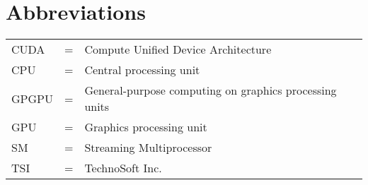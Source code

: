 
\section*{{\Huge Abbreviations}}
\vspace{1 cm}

\noindent
\begin{center}
\begin{tabular}{ l c l }
   CUDA & = & Compute Unified Device Architecture \\
   CPU & = & Central processing unit \\
   GPGPU & = & General-purpose computing on graphics processing units \\
   GPU & = & Graphics processing unit \\
   SM & = & Streaming Multiprocessor \\
   TSI & = & TechnoSoft Inc. \\
\end{tabular}
\end{center}

\cleardoublepage

\pagestyle{fancy}
\fancyhf{}
\renewcommand{\chaptermark}[1]{\markboth{\chaptername\ \thechapter.\ #1}{}}
\renewcommand{\sectionmark}[1]{\markright{\thesection\ #1}}
\renewcommand{\headrulewidth}{0.1ex}
\renewcommand{\footrulewidth}{0.1ex}
\fancyfoot[LE,RO]{\thepage}
\fancyhead[LE]{\leftmark}
\fancyhead[RO]{\rightmark}
\fancypagestyle{plain}{\fancyhf{}\fancyfoot[LE,RO]{\thepage}\renewcommand{\headrulewidth}{0ex}}

\setcounter{page}{1}
